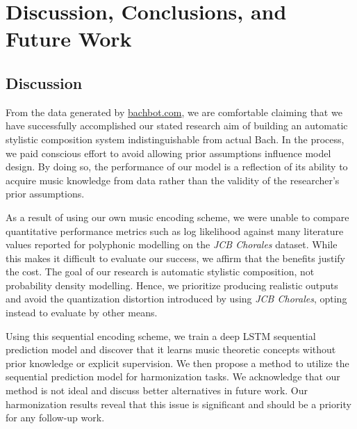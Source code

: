 \chapter{Discussion, Conclusions, and Future Work}\label{ch:conclusion}


\ifpdf
    \graphicspath{{Chapter8/Figs/Raster/}{Chapter8/Figs/PDF/}{Chapter8/Figs/}}
\else
    \graphicspath{{Chapter8/Figs/Vector/}{Chapter8/Figs/}}
\fi

\section{Discussion}

From the data generated by \url{bachbot.com}, we are comfortable claiming that
we have successfully accomplished our stated research aim of building an
automatic stylistic composition system indistinguishable from actual Bach. In
the process, we paid conscious effort to avoid allowing prior assumptions
influence model design. By doing so, the performance of our model is a
reflection of its ability to acquire music knowledge from data rather than the
validity of the researcher's prior assumptions.

As a result of using our own music encoding scheme, we were unable to
compare quantitative performance metrics such as log likelihood against many
literature values reported for polyphonic modelling on the \textit{JCB
Chorales} \citep{Allan2005}dataset. While this makes it difficult to evaluate our success, we
affirm that the benefits justify the cost. The goal of our research is automatic
stylistic composition, not probability density modelling. Hence, we prioritize
producing realistic outputs and avoid the quantization distortion introduced by using
\textit{JCB Chorales}, opting instead to evaluate by other means.

Using this sequential encoding scheme, we train a deep LSTM sequential
prediction model and discover that it learns music theoretic concepts without
prior knowledge or explicit supervision. We then propose a method to utilize
the sequential prediction model for harmonization tasks. We acknowledge that
our method is not ideal and discuss better alternatives in future work. Our
harmonization results reveal that this issue is significant and should
be a priority for any follow-up work.

